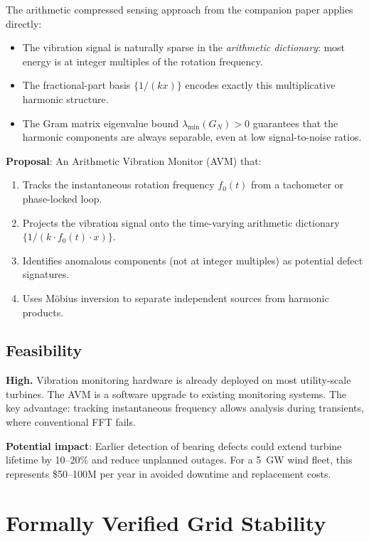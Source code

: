 \documentclass[11pt,a4paper]{article}
\begin{document}
The arithmetic compressed sensing approach from the companion paper
applies directly:

\begin{itemize}
  \item The vibration signal is naturally sparse in the
    \emph{arithmetic dictionary}: most energy is at integer multiples
    of the rotation frequency.
  \item The fractional-part basis $\{1/(kx)\}$ encodes exactly this
    multiplicative harmonic structure.
  \item The Gram matrix eigenvalue bound $\lambda_{\min}(G_N) > 0$
    guarantees that the harmonic components are always separable,
    even at low signal-to-noise ratios.
\end{itemize}

\textbf{Proposal}: An Arithmetic Vibration Monitor (AVM) that:
\begin{enumerate}
  \item Tracks the instantaneous rotation frequency $f_0(t)$ from a
    tachometer or phase-locked loop.
  \item Projects the vibration signal onto the time-varying arithmetic
    dictionary $\{1/(k \cdot f_0(t) \cdot x)\}$.
  \item Identifies anomalous components (not at integer multiples)
    as potential defect signatures.
  \item Uses M\"obius inversion to separate independent sources
    from harmonic products.
\end{enumerate}

\subsection{Feasibility}

\textbf{High.} Vibration monitoring hardware is already deployed on
most utility-scale turbines. The AVM is a software upgrade to
existing monitoring systems. The key advantage: tracking
instantaneous frequency allows analysis during transients, where
conventional FFT fails.

\textbf{Potential impact}: Earlier detection of bearing defects could
extend turbine lifetime by 10--20\% and reduce unplanned outages.
For a 5~GW wind fleet, this represents \$50--100M per year in
avoided downtime and replacement costs.

\section{Formally Verified Grid Stability}
\label{sec:grid}
\end{document}
